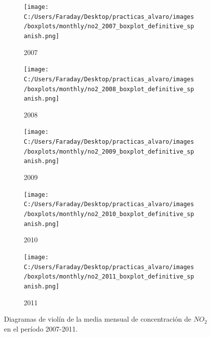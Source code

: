 \documentclass[12pt]{article}
\begin{document}
\begin{figure}[H]
\centering
\begin{subfigure}[H]{0.45\textwidth}
\texttt{[image: C:/Users/Faraday/Desktop/practicas\_alvaro/images/boxplots/monthly/no2\_2007\_boxplot\_definitive\_spanish.png]}
\captionsetup{labelformat=empty}
\caption{2007}
\label{fig:box-no2-2007}
\end{subfigure}
%
\begin{subfigure}[H]{0.45\textwidth}
\texttt{[image: C:/Users/Faraday/Desktop/practicas\_alvaro/images/boxplots/monthly/no2\_2008\_boxplot\_definitive\_spanish.png]}
\captionsetup{labelformat=empty}
\caption{2008}
\label{fig:box-no2-2008}
\end{subfigure}

\begin{subfigure}[H]{0.45\textwidth}
\texttt{[image: C:/Users/Faraday/Desktop/practicas\_alvaro/images/boxplots/monthly/no2\_2009\_boxplot\_definitive\_spanish.png]}
\captionsetup{labelformat=empty}
\caption{2009}
\label{fig:box-no2-2009}
\end{subfigure}
%
\begin{subfigure}[H]{0.45\textwidth}
\texttt{[image: C:/Users/Faraday/Desktop/practicas\_alvaro/images/boxplots/monthly/no2\_2010\_boxplot\_definitive\_spanish.png]}
\captionsetup{labelformat=empty}
\caption{2010}
\label{fig:box-no2-2010}
\end{subfigure}

\begin{subfigure}[H]{0.45\textwidth}
\texttt{[image: C:/Users/Faraday/Desktop/practicas\_alvaro/images/boxplots/monthly/no2\_2011\_boxplot\_definitive\_spanish.png]}
\captionsetup{labelformat=empty}
\caption{2011}
\label{fig:box-no2-2011}
\end{subfigure}
\caption{Diagramas de violín de la media mensual de concentración de $NO_{2}$ en el período 2007-2011.}
\label{fig:box-no2-monthly}
\end{figure}
\end{document}
